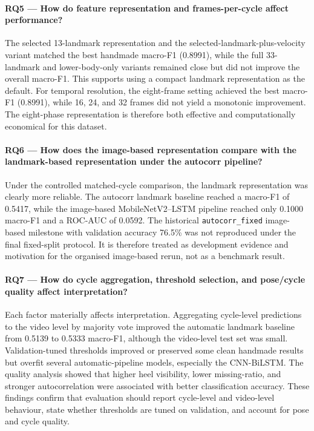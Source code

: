 \paragraph{RQ5 --- How do feature representation and frames-per-cycle affect
performance?}
The selected 13-landmark representation and the selected-landmark-plus-velocity
variant matched the best handmade macro-F1 (0.8991), while the full
33-landmark and lower-body-only variants remained close but did not improve the
overall macro-F1. This supports using a compact landmark representation as the
default. For temporal resolution, the eight-frame setting achieved the best
macro-F1 (0.8991), while 16, 24, and 32 frames did not yield a monotonic
improvement. The eight-phase representation is therefore both effective and
computationally economical for this dataset.

\paragraph{RQ6 --- How does the image-based representation compare with the
landmark-based representation under the autocorr pipeline?}
Under the controlled matched-cycle comparison, the landmark representation was
clearly more reliable. The autocorr landmark baseline reached a macro-F1 of
0.5417, while the image-based MobileNetV2--LSTM pipeline reached only 0.1000
macro-F1 and a ROC-AUC of 0.0592. The historical
\texttt{autocorr\_fixed} image-based milestone with validation accuracy 76.5\%
was not reproduced under the final fixed-split protocol. It is therefore treated
as development evidence and motivation for the organised image-based rerun, not
as a benchmark result.

\paragraph{RQ7 --- How do cycle aggregation, threshold selection, and pose/cycle
quality affect interpretation?}
Each factor materially affects interpretation. Aggregating cycle-level
predictions to the video level by majority vote improved the automatic landmark
baseline from 0.5139 to 0.5333 macro-F1, although the video-level test set was
small. Validation-tuned thresholds improved or preserved some clean handmade
results but overfit several automatic-pipeline models, especially the
CNN-BiLSTM. The quality analysis showed that higher heel visibility, lower
missing-ratio, and stronger autocorrelation were associated with better
classification accuracy. These findings confirm that evaluation should report
cycle-level and video-level behaviour, state whether thresholds are tuned on
validation, and account for pose and cycle quality.

